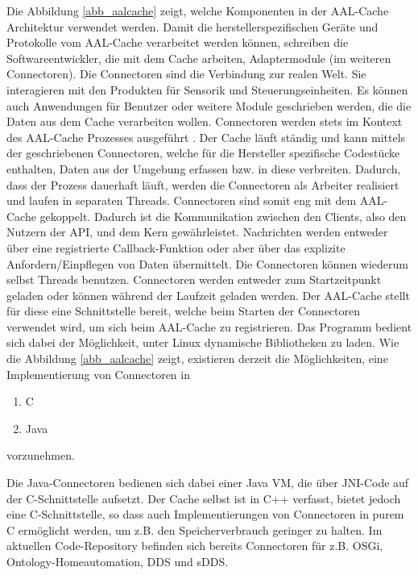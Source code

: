 Die Abbildung \ref{abb_aalcache} zeigt, welche Komponenten in der AAL-Cache Architektur verwendet werden.
Damit die herstellerspezifischen Geräte und Protokolle vom AAL-Cache verarbeitet werden können, schreiben
die Softwareentwickler, die mit dem Cache arbeiten, Adaptermodule (im weiteren Connectoren).
Die Connectoren sind die Verbindung zur realen Welt.
Sie interagieren mit den Produkten für Sensorik und Steuerungseinheiten.
Es können auch Anwendungen für Benutzer oder weitere Module geschrieben werden,
die die Daten aus dem Cache verarbeiten wollen.
Connectoren werden stets im Kontext des AAL-Cache Prozesses ausgeführt \cite{aalcache}.
Der Cache läuft ständig und kann mittels der geschriebenen Connectoren, welche
für die Hersteller spezifische Codestücke enthalten, Daten aus der Umgebung erfassen bzw. in diese verbreiten.
Dadurch, dass der Prozess dauerhaft läuft, werden die Connectoren als Arbeiter realisiert und laufen in
separaten Threads.
Connectoren sind somit eng mit dem AAL-Cache gekoppelt.
Dadurch ist die Kommunikation zwischen den Clients, also den Nutzern der API, und dem Kern gewährleistet.
Nachrichten werden entweder über eine registrierte Callback-Funktion oder aber über das explizite
Anfordern/Einpflegen von Daten übermittelt.
Die Connectoren können wiederum selbst Threads benutzen.
Connectoren werden entweder zum Startzeitpunkt geladen oder können während der Laufzeit geladen werden.
Der AAL-Cache stellt für diese eine Schnittstelle bereit, welche beim Starten der Connectoren
verwendet wird, um sich beim AAL-Cache zu registrieren.
Das Programm bedient sich dabei der Möglichkeit, unter Linux dynamische Bibliotheken zu laden.
Wie die Abbildung \ref{abb_aalcache} zeigt, existieren derzeit die Möglichkeiten, eine Implementierung
von Connectoren in
\begin{enumerate}
\item C
\item Java
\end{enumerate}
vorzunehmen.

Die Java-Connectoren bedienen sich dabei einer Java VM, die über JNI-Code auf der C-Schnittstelle aufsetzt.
Der Cache selbst ist in C++ verfasst, bietet jedoch eine C-Schnittstelle, so dass auch Implementierungen von
Connectoren in purem C ermöglicht werden, um z.B. den Speicherverbrauch geringer zu halten.
Im aktuellen Code-Repository \cite{aalcache_code} befinden sich bereits Connectoren für z.B. OSGi,
Ontology-Homeautomation, DDS und sDDS.

